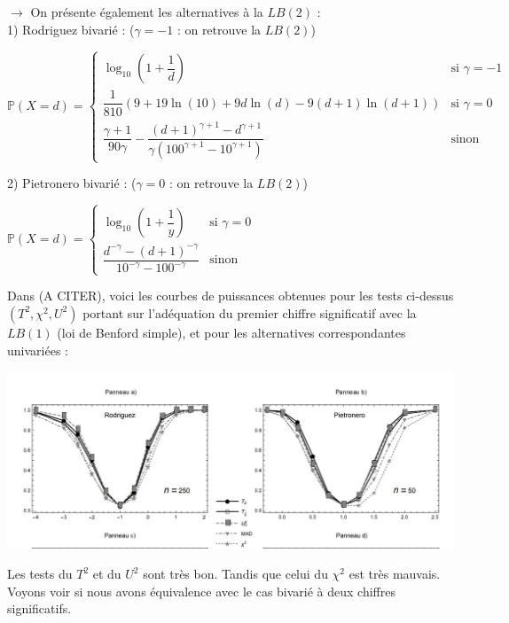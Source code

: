 \documentclass[12pt,a4paper]{article}
\begin{document}
$\rightarrow$ On présente également les alternatives à la $LB(2)$ : \\

1) Rodriguez bivarié : ($\gamma =-1$ : on retrouve la $LB(2)$)
\begin{center}
$\mathbb{P}(X=d) = \left\{
    \begin{array}{ll}
    \log_{10} ( 1 + \dfrac{1}{d} ) & \mbox{si } \gamma = -1 \\
    \dfrac{1}{810} \left( 9+19\ln(10)+9d \ln(d) - 9(d+1) \ln(d+1) \right) & \mbox{si } \gamma = 0 \\
    \dfrac{\gamma+1}{90\gamma} - \dfrac{(d+1)^{\gamma+1} - d^{\gamma+1}}{\gamma( 100^{\gamma+1} - 10^{\gamma+1} )} & \mbox{sinon}
    \end{array}
\right.$
\end{center}
\bigskip

2) Pietronero bivarié : ($\gamma =0$ : on retrouve la $LB(2)$)
\begin{center}
$\mathbb{P}(X=d) = \left\{
    \begin{array}{ll}
    \log_{10} ( 1 + \dfrac{1}{y} ) & \mbox{si } \gamma = 0 \\
    \dfrac{d^{-\gamma} - (d+1)^{-\gamma}}{10^{-\gamma} - 100^{-\gamma}} & \mbox{sinon}
    \end{array}
\right.$
\end{center}
\bigskip

Dans (A CITER), voici les courbes de puissances obtenues pour les tests ci-dessus $(T^{2}, \chi^{2}, U^{2})$ portant sur l'adéquation du premier chiffre significatif avec la $LB(1)$ (loi de Benford simple), et pour les alternatives correspondantes univariées :


\begin{center}
\includegraphics[scale=0.6]{Capture1.JPG}
\end{center}


Les tests du $T^{2}$ et du $U^{2}$ sont très bon. Tandis que celui du $\chi^{2}$ est très mauvais. Voyons voir si nous avons équivalence avec le cas bivarié à deux chiffres significatifs. \\
\end{document}

